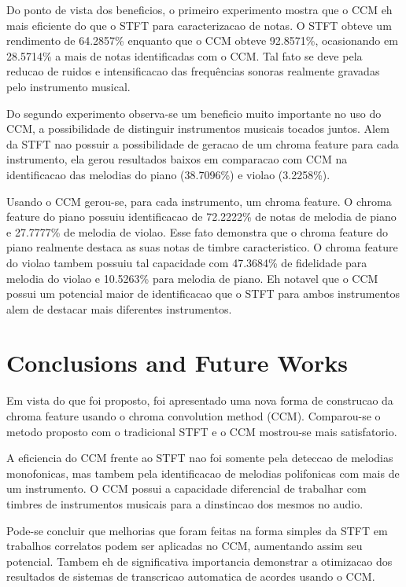 \documentclass{article}
\begin{document}
	Do ponto de vista dos beneficios, o primeiro experimento mostra que o CCM eh mais eficiente do que o STFT para caracterizacao de notas. O STFT obteve um rendimento de 64.2857\% enquanto que o CCM obteve 92.8571\%, ocasionando em 28.5714\% a mais de notas identificadas com o CCM. Tal fato se deve pela reducao de ruidos e intensificacao das frequências sonoras realmente gravadas pelo instrumento musical. 

	Do segundo experimento observa-se um beneficio muito importante no uso do CCM, a possibilidade de distinguir instrumentos musicais tocados juntos. Alem da STFT nao possuir a possibilidade de geracao de um chroma feature para cada instrumento, ela gerou resultados baixos em comparacao com CCM na identificacao das melodias do piano (38.7096\%) e violao (3.2258\%).

	Usando o CCM gerou-se, para cada instrumento, um chroma feature. O chroma feature do piano possuiu identificacao de 72.2222\% de notas de melodia de piano e 27.7777\% de melodia de violao. Esse fato demonstra que o chroma feature do piano realmente destaca as suas notas de timbre caracteristico. O chroma feature do violao tambem possuiu tal capacidade com 47.3684\% de fidelidade para melodia do violao e 10.5263\% para melodia de piano. Eh notavel que o CCM possui um potencial maior de identificacao que o STFT para ambos instrumentos alem de destacar mais diferentes instrumentos.


	\section{Conclusions and Future Works}\label{sec:conclusions}

	Em vista do que foi proposto, foi apresentado uma nova forma de construcao da chroma feature usando o chroma convolution method (CCM). Comparou-se o metodo proposto com o tradicional STFT e o CCM mostrou-se mais satisfatorio. 

	A eficiencia do CCM frente ao STFT nao foi somente pela deteccao de melodias monofonicas, mas tambem pela identificacao de melodias polifonicas com mais de um instrumento. O CCM possui a capacidade diferencial de trabalhar com timbres de instrumentos musicais para a dinstincao dos mesmos no audio.

	 Pode-se concluir que melhorias que foram feitas na forma simples da STFT em trabalhos correlatos podem ser aplicadas no CCM, aumentando assim seu potencial. Tambem eh de significativa importancia demonstrar a otimizacao dos resultados de sistemas de transcricao automatica de acordes usando o CCM.
\end{document}
